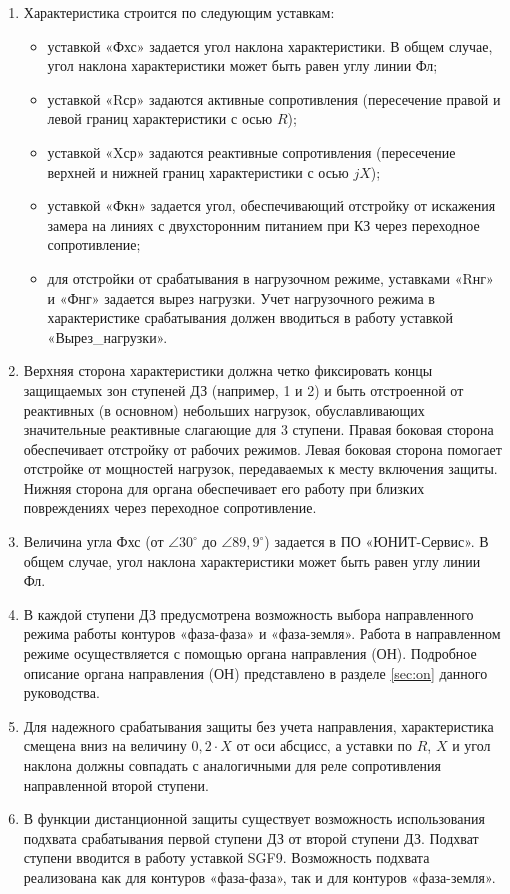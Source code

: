\begin{enumerate}
\begin{enumerate}
\item
Характеристика строится по следующим уставкам:
\begin{itemize} 
    \item уставкой  «Фхс»  задается  угол  наклона  характеристики.  В  общем  случае,  угол  наклона характеристики может быть равен углу линии Фл; 
    \item уставкой  «Rср»  задаются  активные  сопротивления  (пересечение  правой  и  левой  границ характеристики с осью $R$); 
    \item уставкой  «Xср»  задаются  реактивные  сопротивления  (пересечение  верхней  и  нижней  границ характеристики с осью $jX$); 
    \item уставкой  «Фкн»  задается  угол,  обеспечивающий  отстройку  от  искажения  замера  на  линиях  с двухсторонним питанием при КЗ через переходное сопротивление; 
    \item для отстройки от срабатывания в нагрузочном режиме, уставками «Rнг» и «Фнг» задается вырез нагрузки. Учет нагрузочного режима в характеристике срабатывания должен вводиться в работу уставкой «Вырез\_нагрузки».
\end{itemize}

\item
Верхняя сторона характеристики должна четко фиксировать концы защищаемых зон ступеней ДЗ (например, 1 и 2) и быть отстроенной от реактивных (в основном) небольших нагрузок, обуславливающих  значительные реактивные слагающие для 3 ступени. Правая боковая сторона обеспечивает отстройку от рабочих  режимов.  Левая  боковая  сторона  помогает  отстройке  от  мощностей  нагрузок,  передаваемых  к месту включения защиты. Нижняя сторона для органа обеспечивает его работу при близких повреждениях через переходное сопротивление.
\item
Величина угла Фхс (от $\angle{30^\circ}$ до $\angle{89,9^\circ}$) задается в ПО «ЮНИТ-Сервис». В общем случае, угол наклона характеристики может быть равен углу линии Фл. 
\item
В каждой ступени ДЗ предусмотрена возможность выбора направленного режима работы контуров «фаза-фаза» и «фаза-земля».  Работа в направленном  режиме  осуществляется  с  помощью  органа 
направления (ОН). Подробное описание органа направления (ОН) представлено в разделе \ref{sec:on} данного руководства.
\item
Для  надежного  срабатывания  защиты  без  учета  направления,  характеристика  смещена  вниз  на величину $0,2 \cdot X$ от оси абсцисс, а уставки по $R$, $X$ и угол наклона должны совпадать с аналогичными для реле сопротивления направленной второй ступени.
\item
В функции дистанционной защиты существует возможность использования подхвата срабатывания первой ступени ДЗ от второй ступени ДЗ. Подхват ступени вводится в работу уставкой SGF9. Возможность подхвата реализована как для контуров «фаза-фаза», так и для контуров «фаза-земля».


\end{enumerate}
\end{enumerate}
